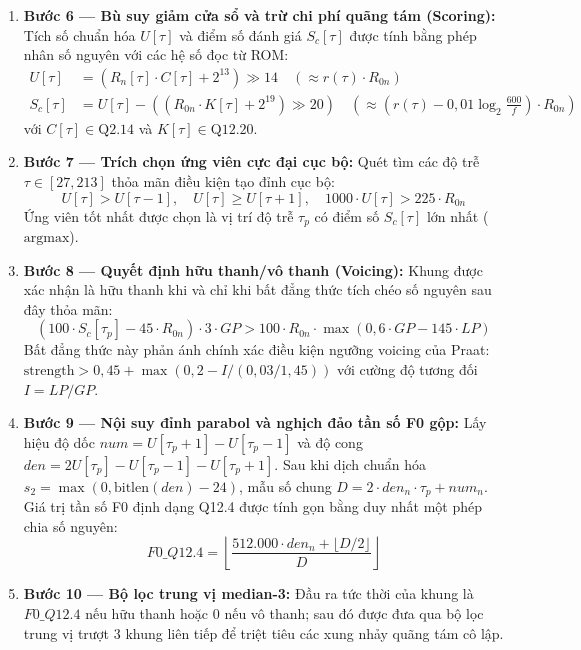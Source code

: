 \begin{enumerate}[leftmargin=1.5em, itemsep=3pt]
    \item \textbf{Bước 6 --- Bù suy giảm cửa sổ và trừ chi phí quãng tám (Scoring):} Tích số chuẩn hóa $U[\tau]$ và điểm số đánh giá $S_c[\tau]$ được tính bằng phép nhân số nguyên với các hệ số đọc từ ROM:
    \begin{align}
        U[\tau] &= (R_n[\tau] \cdot C[\tau] + 2^{13}) \gg 14 \quad (\approx r(\tau) \cdot R_{0n}) \\
        S_c[\tau] &= U[\tau] - \left( (R_{0n} \cdot K[\tau] + 2^{19}) \gg 20 \right) \quad \left(\approx \left(r(\tau) - 0{,}01 \log_2\frac{600}{f}\right) \cdot R_{0n}\right)
    \end{align}
    với $C[\tau] \in \text{Q2.14}$ và $K[\tau] \in \text{Q12.20}$.
    
    \item \textbf{Bước 7 --- Trích chọn ứng viên cực đại cục bộ:} Quét tìm các độ trễ $\tau \in [27, 213]$ thỏa mãn điều kiện tạo đỉnh cục bộ:
    \begin{equation}
        U[\tau] > U[\tau-1], \quad U[\tau] \ge U[\tau+1], \quad 1000 \cdot U[\tau] > 225 \cdot R_{0n}
    \end{equation}
    Ứng viên tốt nhất được chọn là vị trí độ trễ $\tau_p$ có điểm số $S_c[\tau]$ lớn nhất ($\text{argmax}$).
    
    \item \textbf{Bước 8 --- Quyết định hữu thanh/vô thanh (Voicing):} Khung được xác nhận là hữu thanh khi và chỉ khi bất đẳng thức tích chéo số nguyên sau đây thỏa mãn:
    \begin{equation}
        (100 \cdot S_c[\tau_p] - 45 \cdot R_{0n}) \cdot 3 \cdot GP > 100 \cdot R_{0n} \cdot \max(0, 6 \cdot GP - 145 \cdot LP)
    \end{equation}
    Bất đẳng thức này phản ánh chính xác điều kiện ngưỡng voicing của Praat: $\text{strength} > 0{,}45 + \max(0, 2 - I / (0{,}03 / 1{,}45))$ với cường độ tương đối $I = LP / GP$.
    
    \item \textbf{Bước 9 --- Nội suy đỉnh parabol và nghịch đảo tần số F0 gộp:} Lấy hiệu độ dốc $num = U[\tau_p+1] - U[\tau_p-1]$ và độ cong $den = 2 U[\tau_p] - U[\tau_p-1] - U[\tau_p+1]$. Sau khi dịch chuẩn hóa $s_2 = \max(0, \text{bitlen}(den) - 24)$, mẫu số chung $D = 2 \cdot den_n \cdot \tau_p + num_n$. Giá trị tần số F0 định dạng Q12.4 được tính gọn bằng duy nhất một phép chia số nguyên:
    \begin{equation}
        F0\_Q12.4 = \left\lfloor \frac{512.000 \cdot den_n + \lfloor D / 2 \rfloor}{D} \right\rfloor
    \end{equation}
    
    \item \textbf{Bước 10 --- Bộ lọc trung vị median-3:} Đầu ra tức thời của khung là $F0\_Q12.4$ nếu hữu thanh hoặc $0$ nếu vô thanh; sau đó được đưa qua bộ lọc trung vị trượt 3 khung liên tiếp để triệt tiêu các xung nhảy quãng tám cô lập.
\end{enumerate}

